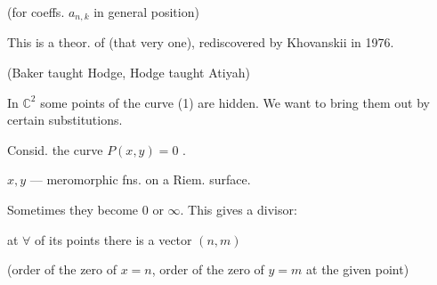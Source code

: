 (for coeffs. $a_{n,k}$ in general position)

This is a theor. of  (that very one), rediscovered by Khovanskii in 1976.

(Baker taught Hodge, Hodge taught Atiyah)

In $\mathbb C^2$ some points of the curve (1) are hidden. We want to bring them out by certain substitutions.

Consid. the curve $P(x,y)=0$ .

$x,y$ --- meromorphic fns. on a Riem. surface.

Sometimes they become $0$ or $\infty$. This gives a divisor:

at $\forall$ of its points there is a vector $(n,m)$

(order of the zero of $x=n$, order of the zero of $y=m$ at the given point)

